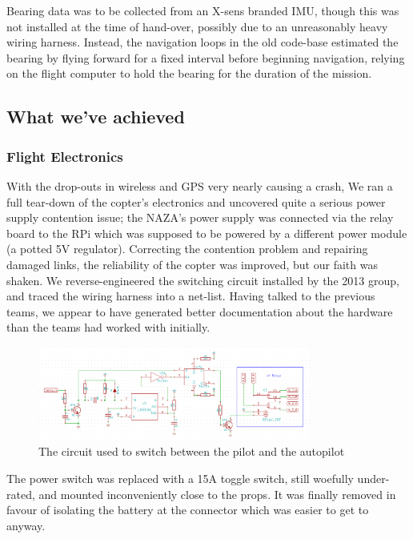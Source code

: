 \documentclass[a4paper, 11pt, titlepage]{article}
\begin{document}
      Bearing data was to be collected from an X-sens branded IMU, though this was not installed at the time of hand-over, possibly due to an unreasonably heavy wiring harness.  Instead, the navigation loops in the old code-base estimated the bearing by flying forward for a fixed interval before beginning navigation, relying on the flight computer to hold the bearing for the duration of the mission.

  \subsection{What we've achieved}

    \subsubsection{Flight Electronics}
      With the drop-outs in wireless and GPS very nearly causing a crash, We ran a full tear-down of the copter's electronics and uncovered quite a serious power supply contention issue; the NAZA's power supply was connected via the relay board to the RPi which was supposed to be powered by a different power module (a potted 5V regulator).  Correcting the contention problem and repairing damaged links, the reliability of the copter was improved, but our faith was shaken.  
      We reverse-engineered the switching circuit installed by the 2013 group, and traced the wiring harness into a net-list.  Having talked to the previous teams, we appear to have generated better documentation about the hardware than the teams had worked with initially.
      \begin{figure}[h!]
        \centering
        \includegraphics[width=0.8\textwidth]{SwitchCircuit.png}
        \caption{The circuit used to switch between the pilot and the autopilot}
      \end{figure}
      The power switch was replaced with a 15A toggle switch, still woefully under-rated, and mounted inconveniently close to the props.  It was finally removed in favour of isolating the battery at the connector which was easier to get to anyway.
\end{document}
